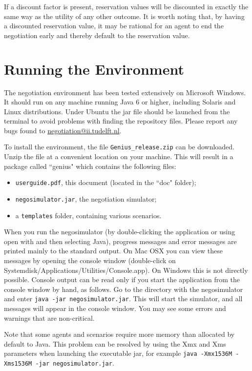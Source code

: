 \documentclass[]{article}
\begin{document}
If a discount factor is present, reservation values will be discounted in exactly the same way as the utility of any other outcome. It is worth noting that, by having a discounted reservation value, it may be rational for an agent to end the negotiation early and thereby default to the reservation value.
 
\section{Running the Environment}
The negotiation environment has been tested extensively on Microsoft Windows. It should run on any machine running Java 6 or higher, including Solaris and Linux distributions. Under Ubuntu the jar file should be launched from the terminal to avoid problems with finding the repository files. Please report any bugs found to \url{negotiation@ii.tudelft.nl}.

To install the environment, the file \texttt{Genius\_release.zip} can be downloaded. Unzip the file at a convenient location on your machine. This will result in a package called ``genius" which contains the following files:

\begin{itemize}
	\item \texttt{userguide.pdf}, this document (located in the ``doc" folder);
	\item \texttt{negosimulator.jar}, the negotiation simulator;
	\item a \texttt{templates} folder, containing various scenarios.
\end{itemize}

When you run the negosimulator (by double-clicking the application or using open with and then selecting Java), progress messages and error messages are printed mainly to the standard output. On Mac OSX you can view these messages by opening the console window (double-click on Systemdisk/Applications/Utilities/Console.app). On Windows this is not directly possible. Console output can be read only if you start the application from the console window by hand, as follows. Go to the directory with the negosimulator and enter
\texttt{java -jar negosimulator.jar}.
This will start the simulator, and all messages will appear in the console window. You may see some errors and warnings that are non-critical.

Note that some agents and scenarios require more memory than allocated by default to Java. This problem can be resolved by using the Xmx and Xms parameters when launching the executable jar, for example \texttt{java -Xmx1536M -Xms1536M -jar negosimulator.jar}.
\end{document}
